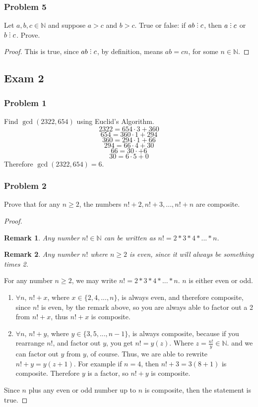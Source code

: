 \documentclass[hidelinks,12pt]{article}
\newtheorem*{remark}{Remark}
\newcommand{\N}{\mathbb{N}}
\newcommand{\divby}{%
  \mathrel{\text{\vbox{\baselineskip.65ex\lineskiplimit0pt\hbox{.}\hbox{.}\hbox{.}}}}%
  }
\begin{document}
\subsubsection{Problem 5}
Let $a,b,c\in\N$ and suppose $a>c$ and $b>c$. True or false: if $ab\divby c$, then $a\divby c$ or $b \divby c$. Prove.
\begin{proof}
This is true, since $ab\divby c$, by definition, means $ab=cn$, for some $n\in\N$.
\end{proof}
\subsection{Exam 2}
\subsubsection{Problem 1}
Find $\gcd(2322,654)$ using Euclid's Algorithm.
$$2322=654\cdot3+360$$ $$654=360\cdot1+294$$ $$360=294\cdot1+66$$ $$294=66\cdot4+30$$ $$66=30\cdot+6$$ $$30=6\cdot5+0$$ Therefore $\gcd(2322,654)=6$.
\subsubsection{Problem 2}
Prove that for any $n\geq2$, the numbers $n!+2,n!+3,...,n!+n$ are composite.
\begin{proof}
\begin{remark} Any number $n!\in\N$ can be written as $n!=2*3*4*...*n$.\end{remark}
\begin{remark} Any number $n!$ where $n\geq2$ is even, since it will always be something times 2. \end{remark}
For any number $n\geq2$, we may write $n!=2*3*4*...*n$. $n$ is either even or odd.
\begin{enumerate}
    \item $\forall n$, $n!+x$, where $x\in\{2,4,...,n\}$, is always even, and therefore composite, since $n!$ is even, by the remark above, so you are always able to factor out a 2 from $n!+x$, thus $n!+x$ is composite.
    \item $\forall n$, $n!+y$, where $y\in\{3,5,...,n-1\}$, is always composite, because if you rearrange $n!$, and factor out $y$, you get $n!=y(z)$. Where $z=\frac{n!}{y}\in\N$. and we can factor out $y$ from $y$, of course. Thus, we are able to rewrite $n!+y=y(z+1)$. For example if $n=4$, then $n!+3=3(8+1)$ is composite. Therefore $y$ is a factor, so $n!+y$ is composite.
\end{enumerate}
Since $n$ plus any even or odd number up to $n$ is composite, then the statement is true.
\end{proof}
\end{document}
